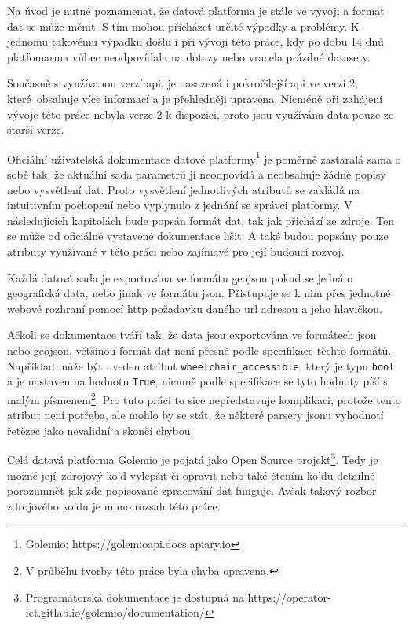 Na úvod je nutné poznamenat, že datová platforma je stále ve vývoji a formát dat se může měnit. S tím mohou přicházet určité výpadky a problémy. K jednomu takovému výpadku došlu i při vývoji této práce, kdy po dobu 14 dnů platfomarma vůbec neodpovídala na dotazy nebo vracela prázdné datasety.

\bigbreak

Současně s využívanou verzí \gls{api}, je nasazená i pokročilejší \gls{api} ve verzi 2, které obsahuje více informací a je přehledněji upravena. Nicméně při zahájení vývoje této práce nebyla verze 2 k dispozici, proto jsou využívána data pouze ze starší verze.

\bigbreak

Oficiální uživatelská dokumentace datové platformy\footnote{Golemio: https://golemioapi.docs.apiary.io} je poměrně zastaralá sama o sobě tak, že aktuální sada parametrů jí neodpovídá a neobsahuje žádné popisy nebo vysvětlení dat. Proto vysvětlení jednotlivých atributů se zakládá na intuitivním pochopení nebo vyplynulo z jednání se správci platformy. V následujících kapitolách bude popsán formát dat, tak jak přichází ze zdroje. Ten se může od oficiálně vystavené dokumentace lišit. A také budou popsány pouze atributy využívané v této práci nebo zajímavé pro její budoucí rozvoj.

\bigbreak

Každá datová sada je exportována ve formátu \gls{geojson} pokud se jedná o geografická data, nebo jinak ve formátu \gls{json}. Přistupuje se k nim přes jednotné webové rozhraní pomocí \gls{http} požadavku daného \gls{url} adresou a jeho hlavičkou.

\bigbreak

Ačkoli se dokumentace tváří tak, že data jsou exportována ve formátech \gls{json} nebo \gls{geojson}, většinou formát dat není přesně podle specifikace těchto formátů. Například může být uveden atribut \verb"wheelchair_accessible", který je typu \verb"bool" a je nastaven na hodnotu \verb"True", nicmně podle specifikace se tyto hodnoty píší s malým písmenem\footnote{V průběhu tvorby této práce byla chyba opravena.}. Pro tuto práci to sice nepředstavuje komplikaci, protože tento atribut není potřeba, ale mohlo by se stát, že některé parsery \gls{json}u vyhodnotí řetězec jako nevalidní a skončí chybou.

\bigbreak

Celá datová platforma Golemio je pojatá jako Open Source projekt\footnote{Programátorská dokumentace je dostupná na https://operator-ict.gitlab.io/golemio/documentation/}. Tedy je možné její zdrojový ko'd vylepšit či opravit nebo také čtením ko'du detailně porozumnět jak zde popisované zpracování dat funguje. Avšak takový rozbor zdrojového ko'du je mimo rozsah této práce.

